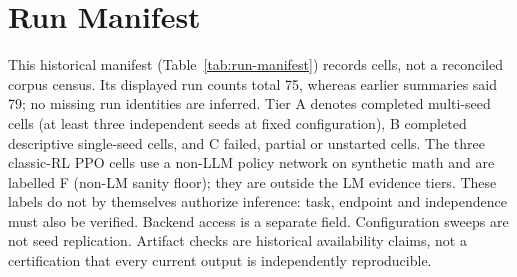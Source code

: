 \section{Run Manifest}
\label{sec:run-manifest}

This historical manifest (Table~\ref{tab:run-manifest}) records cells, not a
reconciled corpus census. Its displayed run counts total 75, whereas earlier summaries said 79; no missing
run identities are inferred. Tier A denotes completed multi-seed cells (at least
three independent seeds at fixed configuration), B completed descriptive
single-seed cells, and C failed, partial or unstarted cells. The three
classic-RL PPO cells use a non-LLM policy network on synthetic math and are
labelled F (non-LM sanity floor); they are outside the LM evidence tiers. These labels do
not by themselves authorize inference: task, endpoint and independence must
also be verified. Backend access is a separate field. Configuration sweeps
are not seed replication. Artifact checks are historical availability claims,
not a certification that every current output is independently reproducible.

